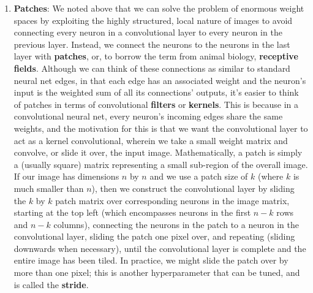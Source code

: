 \documentclass{article}
\begin{document}
\begin{enumerate}
\begin{enumerate}
        \item \textbf{Patches}: We noted above that we can solve the problem of enormous weight spaces by exploiting the highly structured, local nature of images to avoid connecting every neuron in a convolutional layer to every neuron in the previous layer. Instead, we connect the neurons to the neurons in the last layer with \textbf{patches}, or, to borrow the term from animal biology, \textbf{receptive fields}. Although we can think of these connections as similar to standard neural net edges, in that each edge has an associated weight and the neuron's input is the weighted sum of all its connections' outputs, it's easier to think of patches in terms of convolutional \textbf{filters} or \textbf{kernels}. This is because in a convolutional neural net, every neuron's incoming edges share the same weights, and the motivation for this is that we want the convolutional layer to act as a kernel convolutional, wherein we take a small weight matrix and convolve, or slide it over, the input image. Mathematically, a patch is simply a (usually square) matrix representing a small sub-region of the overall image. If our image has dimensions $ n $ by $ n $ and we use a patch size of $ k $ (where $ k $ is much smaller than $ n $), then we construct the convolutional layer by sliding the $ k $ by $ k $ patch matrix over corresponding neurons in the image matrix, starting at the top left (which encompasses neurons in the first $ n - k $ rows and $ n - k $ columns), connecting the neurons in the patch to a neuron in the convolutional layer, sliding the patch one pixel over, and repeating (sliding downwards when necessary), until the convolutional layer is complete and the entire image has been tiled. In practice, we might slide the patch over by more than one pixel; this is another hyperparameter that can be tuned, and is called the \textbf{stride}.

\end{enumerate}
\end{enumerate}
\end{document}
